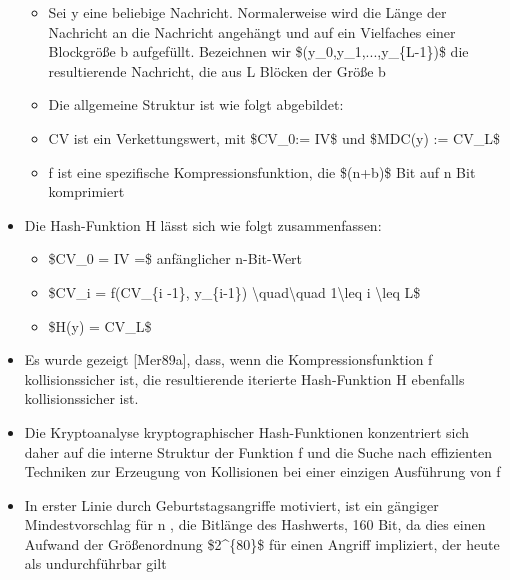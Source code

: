 \documentclass[a4paper]{article}
\begin{document}
\begin{multicols}{3}
\begin{itemize}
              \begin{itemize}
                  \item
                        Sei y eine beliebige Nachricht. Normalerweise wird die Länge der
                        Nachricht an die Nachricht angehängt und auf ein Vielfaches einer
                        Blockgröße b aufgefüllt. Bezeichnen wir
                        \$(y\_0,y\_1,...,y\_\{L-1\})\$ die resultierende Nachricht, die aus
                        L Blöcken der Größe b
                  \item
                        Die allgemeine Struktur ist wie folgt abgebildet:
                  \item
                        CV ist ein Verkettungswert, mit \$CV\_0:= IV\$ und \$MDC(y) :=
                        CV\_L\$
                  \item
                        f ist eine spezifische Kompressionsfunktion, die \$(n+b)\$ Bit auf n
                        Bit komprimiert
              \end{itemize}
        \item
              Die Hash-Funktion H lässt sich wie folgt zusammenfassen:

              \begin{itemize}
                  \item
                        \$CV\_0 = IV =\$ anfänglicher n-Bit-Wert
                  \item
                        \$CV\_i = f(CV\_\{i -1\}, y\_\{i-1\})
                        \textbackslash quad\textbackslash quad 1\textbackslash leq i
                        \textbackslash leq L\$
                  \item
                        \$H(y) = CV\_L\$
              \end{itemize}
        \item
              Es wurde gezeigt {[}Mer89a{]}, dass, wenn die Kompressionsfunktion f
              kollisionssicher ist, die resultierende iterierte Hash-Funktion H
              ebenfalls kollisionssicher ist.
        \item
              Die Kryptoanalyse kryptographischer Hash-Funktionen konzentriert sich
              daher auf die interne Struktur der Funktion f und die Suche nach
              effizienten Techniken zur Erzeugung von Kollisionen bei einer einzigen
              Ausführung von f
        \item
              In erster Linie durch Geburtstagsangriffe motiviert, ist ein gängiger
              Mindestvorschlag für n , die Bitlänge des Hashwerts, 160 Bit, da dies
              einen Aufwand der Größenordnung \$2\^{}\{80\}\$ für einen Angriff
              impliziert, der heute als undurchführbar gilt
    \end{itemize}



\end{multicols}
\end{document}
